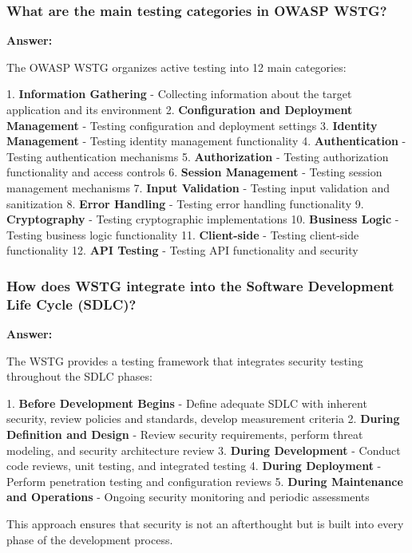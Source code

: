 \documentclass[12pt,a4paper]{article}
\begin{document}
\subsubsection{What are the main testing categories in OWASP WSTG?}

\textbf{Answer:}

The OWASP WSTG organizes active testing into 12 main categories: 

1. \textbf{Information Gathering} - Collecting information about the target application and its environment
2. \textbf{Configuration and Deployment Management} - Testing configuration and deployment settings
3. \textbf{Identity Management} - Testing identity management functionality
4. \textbf{Authentication} - Testing authentication mechanisms
5. \textbf{Authorization} - Testing authorization functionality and access controls
6. \textbf{Session Management} - Testing session management mechanisms
7. \textbf{Input Validation} - Testing input validation and sanitization
8. \textbf{Error Handling} - Testing error handling functionality
9. \textbf{Cryptography} - Testing cryptographic implementations
10. \textbf{Business Logic} - Testing business logic functionality
11. \textbf{Client-side} - Testing client-side functionality
12. \textbf{API Testing} - Testing API functionality and security

\subsubsection{How does WSTG integrate into the Software Development Life Cycle (SDLC)?}

\textbf{Answer:}

The WSTG provides a testing framework that integrates security testing throughout the SDLC phases: 

1. \textbf{Before Development Begins} - Define adequate SDLC with inherent security, review policies and standards, develop measurement criteria
2. \textbf{During Definition and Design} - Review security requirements, perform threat modeling, and security architecture review
3. \textbf{During Development} - Conduct code reviews, unit testing, and integrated testing
4. \textbf{During Deployment} - Perform penetration testing and configuration reviews
5. \textbf{During Maintenance and Operations} - Ongoing security monitoring and periodic assessments

This approach ensures that security is not an afterthought but is built into every phase of the development process. 
\end{document}
